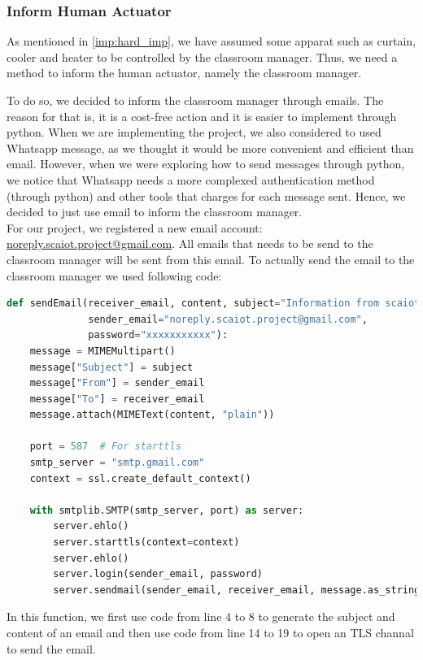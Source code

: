 \documentclass[runningheads]{llncs}
\begin{document}
\subsubsection{Inform Human Actuator}\hfill
\label{soft_imp:actuator}
\newline
As mentioned in \ref{imp:hard_imp}, we have assumed some apparat such as curtain, cooler and heater to be controlled by the classroom manager. Thus, we need a method to inform the human actuator, namely the classroom manager.

To do so, we decided to inform the classroom manager through emails. The reason for that is, it is a cost-free action and it is easier to implement through python. When we are implementing the project, we also considered to used Whatsapp message, as we thought it would be more convenient and efficient than email. However, when we were exploring how to send messages through python, we notice that Whatsapp needs a more complexed authentication method (through python) and other tools that charges for each message sent. Hence, we decided to just use email to inform the classroom manager.\\

For our project, we registered a new email account: \url{noreply.scaiot.project@gmail.com}. All emails that needs to be send to the classroom manager will be sent from this email. To actually send the email to the classroom manager we used following code:
\begin{lstlisting}[language=python]
def sendEmail(receiver_email, content, subject="Information from scaiot project",
              sender_email="noreply.scaiot.project@gmail.com",
              password="xxxxxxxxxxx"):
    message = MIMEMultipart()
    message["Subject"] = subject
    message["From"] = sender_email
    message["To"] = receiver_email
    message.attach(MIMEText(content, "plain"))

    port = 587  # For starttls
    smtp_server = "smtp.gmail.com"
    context = ssl.create_default_context()

    with smtplib.SMTP(smtp_server, port) as server:
        server.ehlo()  
        server.starttls(context=context)
        server.ehlo()  
        server.login(sender_email, password)
        server.sendmail(sender_email, receiver_email, message.as_string())
\end{lstlisting}
In this function, we first use code from line 4 to 8 to generate the subject and content of an email and then use code from line 14 to 19 to open an TLS channal to send the email.
\end{document}
